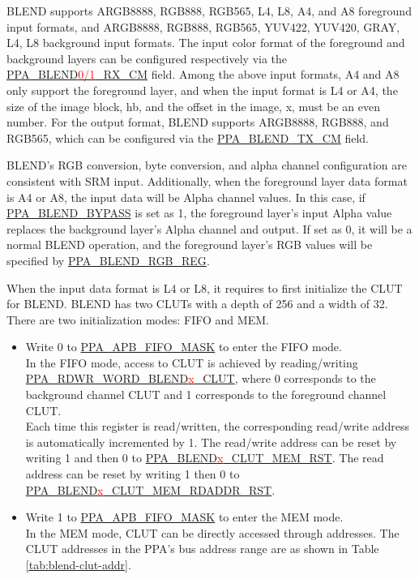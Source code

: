 \documentclass[main\_\_EN.tex]{subfiles}
\begin{document}
BLEND supports ARGB8888, RGB888, RGB565, L4, L8, A4, and A8 foreground input formats, and ARGB8888, RGB888, RGB565, YUV422, YUV420, GRAY, L4, L8 background input formats. The input color format of the foreground and background layers can be configured respectively via the \hyperref[fielddesc:PPABLEND0RXCM]{PPA\_BLEND\textcolor{red}{0/1}\_RX\_CM} field. Among the above input formats, A4 and A8 only support the foreground layer, and when the input format is L4 or A4, the size of the image block, hb, and the offset in the image, x, must be an even number. For the output format, BLEND supports ARGB8888, RGB888, and RGB565, which can be configured via the \hyperref[fielddesc:PPABLENDTXCM]{PPA\_BLEND\_TX\_CM} field.

BLEND's RGB conversion, byte conversion, and alpha channel configuration are consistent with SRM input. Additionally, when the foreground layer data format is A4 or A8, the input data will be Alpha channel values. In this case, if \hyperref[fielddesc:PPABLENDBYPASS]{PPA\_BLEND\_BYPASS} is set as 1, the foreground layer's input Alpha value replaces the background layer's Alpha channel and output. If set as 0, it will be a normal BLEND operation, and the foreground layer's RGB values will be specified by \hyperref[regdesc:PPABLENDRGBREG]{PPA\_BLEND\_RGB\_REG}.

When the input data format is L4 or L8, it requires to first initialize the CLUT for BLEND. BLEND has two CLUTs with a depth of 256 and a width of 32. There are two initialization modes: FIFO and MEM.

\begin{itemize}
    \item Write 0 to \hyperref[fielddesc:PPAAPBFIFOMASK]{PPA\_APB\_FIFO\_MASK} to enter the FIFO mode. \\
    In the FIFO mode, access to CLUT is achieved by reading/writing \hyperref[fielddesc:PPARDWRWORDBLEND0CLUT]{PPA\_RDWR\_WORD\_BLEND\textcolor{red}{x}\_CLUT}, where 0 corresponds to the background channel CLUT and 1 corresponds to the foreground channel CLUT. \\
    Each time this register is read/written, the corresponding read/write address is automatically incremented by 1. The read/write address can be reset by writing 1 and then 0 to \hyperref[fielddesc:PPABLEND0CLUTMEMRST]{PPA\_BLEND\textcolor{red}{x}\_CLUT\_MEM\_RST}. The read address can be reset by writing 1 then 0 to \hyperref[fielddesc:PPABLEND0CLUTMEMRDADDRRST]{PPA\_BLEND\textcolor{red}{x}\_CLUT\_MEM\_RDADDR\_RST}.
    \item Write 1 to \hyperref[fielddesc:PPAAPBFIFOMASK]{PPA\_APB\_FIFO\_MASK} to enter the MEM mode. \\
    In the MEM mode, CLUT can be directly accessed through addresses. The CLUT addresses in the PPA's bus address range are as shown in Table \ref{tab:blend-clut-addr}.
\end{itemize}
\end{document}
